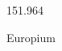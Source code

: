 \documentclass[12pt]{article}
\begin{document}
\hfill{}
\vfill
\begin{center}
  {\fontsize{50}{60}
  }

  \vspace{1em}

  151.964

Europium
\end{center}
\vfill
\end{document}
